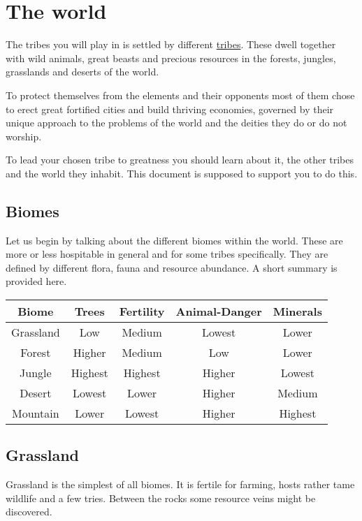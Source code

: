 \chapter{The world}

The tribes you will play in is settled by different
\hyperref[ch:Tribes]{tribes}. These dwell together with wild animals, great
beasts and precious resources in the forests, jungles, grasslands and deserts
of the world.

To protect themselves from the elements and their opponents most of them chose
to erect great fortified cities and build thriving economies, governed by their
unique approach to the problems of the world and the deities they do or do not
worship.

To lead your chosen tribe to greatness you should learn about it, the other
tribes and the world they inhabit. This document is supposed to support you to
do this.

\section{Biomes}
Let us begin by talking about the different biomes within the world. These are
more or less hospitable in general and for some tribes specifically. They are
defined by different flora, fauna and resource abundance. A short summary is
provided here.

\begin{longtable}{cc ccc}
	\toprule
	Biome     & Trees   & Fertility & Animal-Danger & Minerals \\
	\midrule
	Grassland & Low     & Medium    & Lowest        & Lower    \\
	Forest    & Higher  & Medium    & Low           & Lower    \\
	Jungle    & Highest & Highest   & Higher        & Lowest   \\
	Desert    & Lowest  & Lower     & Higher        & Medium   \\
	Mountain  & Lower   & Lowest    & Higher        & Highest  \\
	\bottomrule
\end{longtable}

\section{Grassland}
Grassland is the simplest of all biomes. It is fertile for farming, hosts
rather tame wildlife and a few tries. Between the rocks some resource veins
might be discovered.

